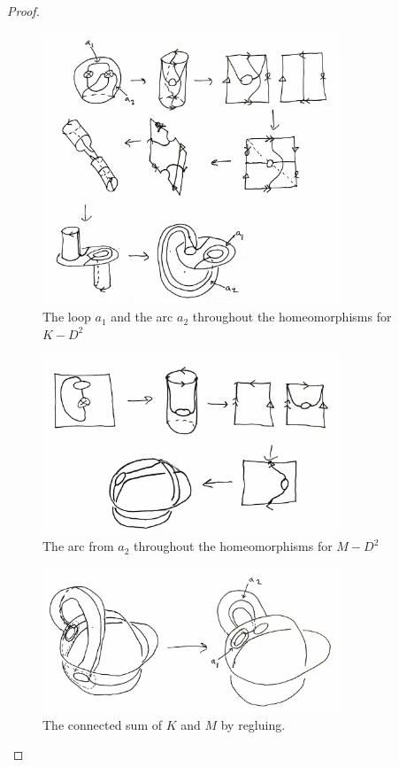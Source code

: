 \documentclass[reqno]{amsart}
\theoremstyle{definition}
\theoremstyle{remark}
\begin{document}
\begin{proof}
\begin{figure}[htpb]
    \centering
    \includegraphics[width=0.8\textwidth]{part1-deformation-curve.jpg}
    \caption{The loop
    $a_1$ and the arc $a_2$ throughout the homeomorphisms for
$K-D^2$}
    \label{fig:part1-deformation-curve-jpg}
\end{figure}

\begin{figure}[htpb]
    \centering
    \includegraphics[width=0.8\textwidth]{part2-deformation-curve.jpg}
    \caption{The arc from $a_2$ throughout the homeomorphisms
    for $M-D^2$}
    \label{fig:part2-deformation-curve-jpg}
\end{figure}

\begin{figure}[htpb]
    \centering
    \includegraphics[width=0.8\textwidth]{klein-to-torus-curve.jpg}
    \caption{The connected sum
    of $K$ and $M$ by regluing.}
    \label{fig:klein-to-torus-curve-jpg}
\end{figure}


\end{proof}
\end{document}
